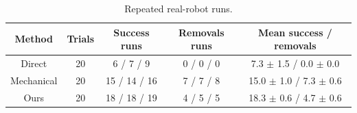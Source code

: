 \begin{table}[t]
  \centering
  \caption{Repeated real-robot runs.}
  \label{tab:supp_real_robot_repeats}
  \small
  \setlength{\tabcolsep}{3.8pt}
  \begin{tabular}{ccccc}
    \toprule
    Method & Trials & Success runs & Removals runs & Mean success / removals \\
    \midrule
    Direct & 20 & 6 / 7 / 9 & 0 / 0 / 0 & 7.3 $\pm$ 1.5 / 0.0 $\pm$ 0.0 \\
    Mechanical & 20 & 15 / 14 / 16 & 7 / 7 / 8 & 15.0 $\pm$ 1.0 / 7.3 $\pm$ 0.6 \\
    Ours & 20 & 18 / 18 / 19 & 4 / 5 / 5 & 18.3 $\pm$ 0.6 / 4.7 $\pm$ 0.6 \\
    \bottomrule
  \end{tabular}
\end{table}